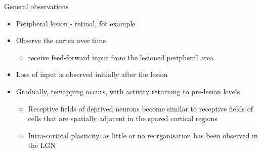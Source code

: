 \begin{frame}{General observations}
  \begin{itemize}
    \item Peripheral lesion - retinal, for example
    \item Observe the cortex over time
    \begin{itemize}
      \item receive feed-forward input from the lesioned peripheral area
    \end{itemize}
    \pause
  \item \alert{Loss of input} is observed initially after the lesion
    \pause
  \item Gradually, \alert{remapping} occurs, with activity returning to pre-lesion levels
    \begin{itemize}
      \item \alert{Receptive fields} of deprived neurons \alert{become similar to} receptive fields of cells that are spatially adjacent in the spared cortical regions
      \item \alert{Intra-cortical plasticity}, as little or no reorganisation has been observed in the LGN
    \end{itemize}
  \end{itemize}
\end{frame}
